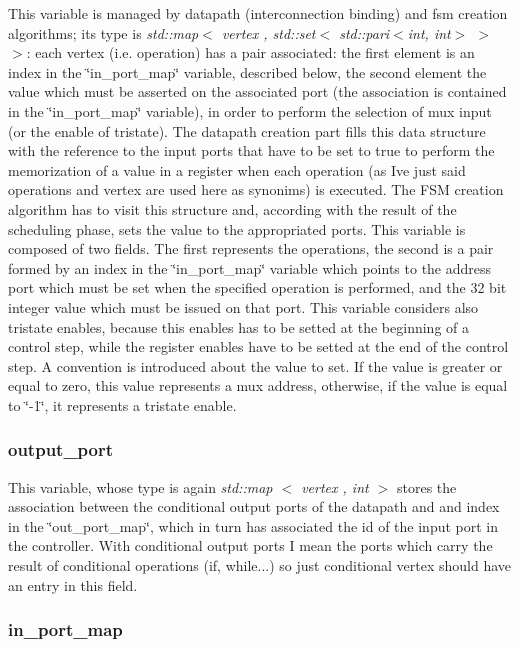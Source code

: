 This variable is managed by datapath (interconnection binding) and fsm creation algorithms; its type is {\itshape std\+::map$<$ vertex , std\+::set$<$ std\+::pari$<$int, int$>$ $>$ $>$}\+: each vertex (i.\+e. operation) has a pair associated\+: the first element is an index in the \char`\"{}in\+\_\+port\+\_\+map\char`\"{} variable, described below, the second element the value which must be asserted on the associated port (the association is contained in the \char`\"{}in\+\_\+port\+\_\+map\char`\"{} variable), in order to perform the selection of mux input (or the enable of tristate). The datapath creation part fills this data structure with the reference to the input ports that have to be set to true to perform the memorization of a value in a register when each operation (as I\textquotesingle{}ve just said operations and vertex are used here as synonims) is executed. The F\+SM creation algorithm has to visit this structure and, according with the result of the scheduling phase, sets the value to the appropriated ports. This variable is composed of two fields. The first represents the operations, the second is a pair formed by an index in the \char`\"{}in\+\_\+port\+\_\+map\char`\"{} variable which points to the address port which must be set when the specified operation is performed, and the 32 bit integer value which must be issued on that port. This variable considers also tristate enables, because this enables has to be setted at the beginning of a control step, while the register enables have to be setted at the end of the control step. A convention is introduced about the value to set. If the value is greater or equal to zero, this value represents a mux address, otherwise, if the value is equal to \char`\"{}-\/1\char`\"{}, it represents a tristate enable. \hypertarget{src_HLS_page_output_port}{}\subsubsection{output\+\_\+port}\label{src_HLS_page_output_port}
This variable, whose type is again {\itshape std\+::map $<$ vertex , int $>$} stores the association between the conditional output ports of the datapath and and index in the \char`\"{}out\+\_\+port\+\_\+map\char`\"{}, which in turn has associated the id of the input port in the controller. With conditional output ports I mean the ports which carry the result of conditional operations (if, while...) so just conditional vertex should have an entry in this field. \hypertarget{src_HLS_page_in_port_map}{}\subsubsection{in\+\_\+port\+\_\+map}\label{src_HLS_page_in_port_map}
